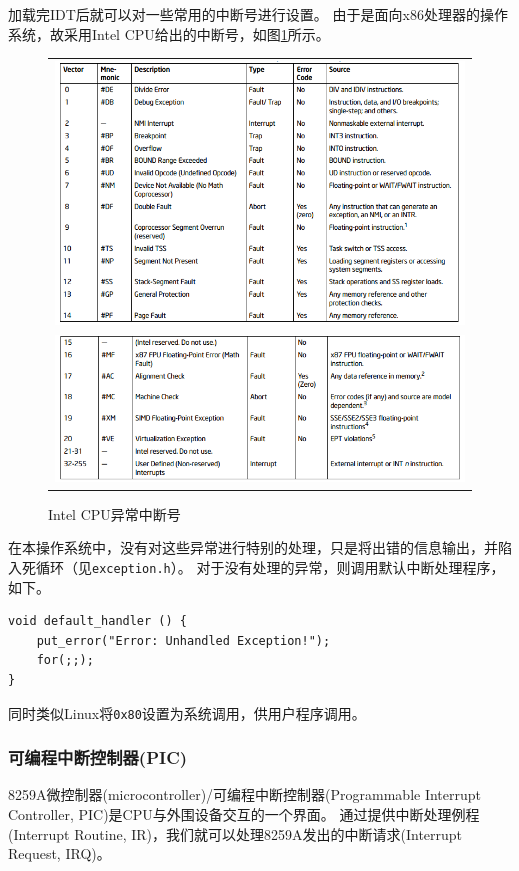 \documentclass[logo,reportComp]{thesis}
\begin{document}
加载完IDT后就可以对一些常用的中断号进行设置。
由于是面向x86处理器的操作系统，故采用Intel CPU给出的中断号，如图\ref{fig:exceptions}所示。
\begin{figure}[H]
\centering
\begin{tabular}{c}
\includegraphics[width=0.8\linewidth]{fig/exceptions1.PNG}\\
\includegraphics[width=0.8\linewidth]{fig/exceptions2.PNG}
\end{tabular}
\caption{Intel CPU异常中断号}
\label{fig:exceptions}
\end{figure}

在本操作系统中，没有对这些异常进行特别的处理，只是将出错的信息输出，并陷入死循环（见\verb'exception.h'）。
对于没有处理的异常，则调用默认中断处理程序，如下。
\begin{lstlisting}
void default_handler () {
	put_error("Error: Unhandled Exception!");
	for(;;);
}
\end{lstlisting}

同时类似Linux将\verb'0x80'设置为系统调用，供用户程序调用。

\subsubsection{可编程中断控制器(PIC)}
8259A微控制器(microcontroller)/可编程中断控制器(Programmable Interrupt Controller, PIC)是CPU与外围设备交互的一个界面。
通过提供中断处理例程(Interrupt Routine, IR)，我们就可以处理8259A发出的中断请求(Interrupt Request, IRQ)。
\end{document}
